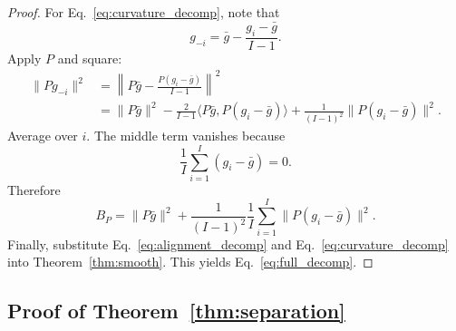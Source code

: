 \documentclass{article}
\begin{document}
\begin{proof}
For Eq.~\eqref{eq:curvature_decomp}, note that
\begin{equation}
    g_{-i}
    =
    \bar g - \frac{g_i-\bar g}{I-1}.
\end{equation}
Apply $P$ and square:
\begin{align}
    \|P g_{-i}\|^2
    &=
    \left\|P\bar g - \frac{P(g_i-\bar g)}{I-1}\right\|^2 \\
    &=
    \|P\bar g\|^2
    -
    \frac{2}{I-1}\langle P\bar g, P(g_i-\bar g)\rangle
    +
    \frac{1}{(I-1)^2}\|P(g_i-\bar g)\|^2.
\end{align}
Average over $i$. The middle term vanishes because
\begin{equation}
    \frac{1}{I}\sum_{i=1}^{I} (g_i-\bar g) = 0.
\end{equation}
Therefore
\begin{equation}
    B_P
    =
    \|P\bar g\|^2
    +
    \frac{1}{(I-1)^2}\frac{1}{I}\sum_{i=1}^{I}\|P(g_i-\bar g)\|^2.
\end{equation}
Finally, substitute Eq.~\eqref{eq:alignment_decomp} and Eq.~\eqref{eq:curvature_decomp} into Theorem~\ref{thm:smooth}. This yields Eq.~\eqref{eq:full_decomp}.
\end{proof}

\subsection{Proof of Theorem~\ref{thm:separation}}
\end{document}
